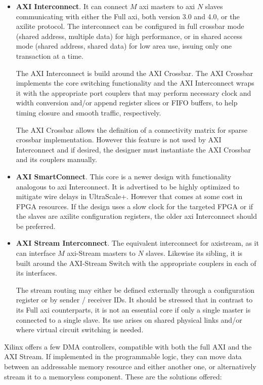\begin{itemize}
\item	\textbf{AXI Interconnect}.
	It can connect $M$ \gls{axi} masters to \gls{axi} $N$ slaves
	communicating with either the Full \gls{axi},
	both version 3.0 and 4.0, or the \gls{axilite} protocol.
	The interconnect can be configured in full crossbar mode
	(shared address, multiple data) for high performance,
	or in shared access mode (shared address, shared data)
	for low area use, issuing only one transaction at a time.

	The AXI Interconnect is build around the AXI Crossbar.
	The AXI Crossbar implements the core switching functionality
	and the AXI Interconnect wraps it with the appropriate port couplers that may
	perform necessary clock and width conversion and/or append register slices or FIFO buffers,
	to help timing closure and smooth traffic, respectively.

	The AXI Crossbar allows the definition of a connectivity matrix
	for sparse crossbar implementation.
	However this feature is not used by AXI Interconnect and if desired,
	the designer must instantiate the AXI Crossbar and its couplers manually.

\item	\textbf{AXI SmartConnect}.
	This core is a newer design with functionality analogous to \gls{axi} Interconnect.
	It is advertised to be highly optimized to mitigate wire delays in UltraScale+.
	However that comes at some cost in FPGA resources.
	If the design uses a slow clock for the targeted FPGA or
	if the slaves are \gls{axilite} configuration registers,
	the older \gls{axi} Interconnect should be preferred.

\item	\textbf{AXI Stream Interconnect}.
	The equivalent interconnect for \gls{axistream},
	as it can interface $M$ \gls{axi}-Stream masters to $N$ slaves.
	Likewise its sibling, it is built around the AXI-Stream Switch with the appropriate
	couplers in each of its interfaces.

	The stream routing may either be defined externally through
	a configuration register or by sender / receiver IDs.
	It should be stressed that in contrast to its Full \gls{axi} counterparts,
	it is not an essential core if only a single master is connected to a single slave.
	Its use arises on shared physical links and/or where virtual circuit switching is needed.
\end{itemize}

Xilinx offers a few DMA controllers, compatible with both the full AXI and the AXI Stream.
If implemented in the programmable logic, they can move data between an
addressable memory resource and either another one, or alternatively stream it
to a memoryless component. These are the solutions offered:

